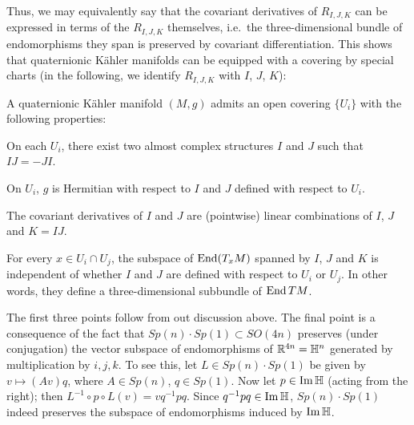 Thus, we may equivalently say that the covariant derivatives of $R_{I,J,K}$ can be expressed in terms of the $R_{I,J,K}$ themselves, i.e.~the three-dimensional bundle of endomorphisms they span is preserved by covariant differentiation. This shows that quaternionic K\"ahler manifolds can be equipped with a covering by special charts (in the following, we identify $R_{I,J,K}$ with $I$, $J$, $K$):

\begin{prop}\label{prop:QKcharts}
	A quaternionic K\"ahler manifold $(M,g)$ admits an open covering $\{U_i\}$ with the following properties:
	\begin{numberedlist}
		\item On each $U_i$, there exist two almost complex structures $I$ and $J$ such that $IJ=-JI$.
		\item On $U_i$, $g$ is Hermitian with respect to $I$ and $J$ defined with respect to $U_i$.
		\item The covariant derivatives of $I$ and $J$ are (pointwise) linear combinations of $I$, $J$ and $K=IJ$.
		\item For every $x\in U_i\cap U_j$, the subspace of $\operatorname{End}(T_xM)$ spanned by $I$, $J$ and $K$ is independent of whether $I$ and $J$ are defined with respect to $U_i$ or $U_j$. In other words, they define a three-dimensional subbundle of $\operatorname{End} TM$.
	\end{numberedlist}
\end{prop}
\begin{myproof}
	The first three points follow from out discussion above. The final point is a consequence of the fact that $Sp(n)\cdot Sp(1)\subset SO(4n)$ preserves (under conjugation) the vector subspace of endomorphisms of $\mathbb{R}^{4n}=\mathbb{H}^n$ generated by multiplication by $i,j,k$. To see this, let $L\in Sp(n)\cdot Sp(1)$ be given by $v\mapsto (Av)q$, where $A\in Sp(n)$, $q\in Sp(1)$. Now let $p\in \operatorname{Im} \mathbb{H}$ (acting from the right); then $L^{-1}\circ p\circ L(v)=vq^{-1}pq$. Since $q^{-1}pq\in \operatorname{Im}\mathbb{H}$, $Sp(n)\cdot Sp(1)$ indeed preserves the subspace of endomorphisms induced by $\operatorname{Im}\mathbb{H}$.
\end{myproof}

